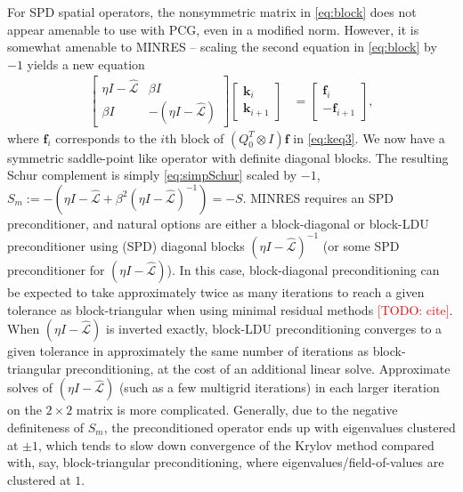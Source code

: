\documentclass[review]{siamart}
\makeatletter
\newcommand{\todo}[1]{\textcolor{red}{[TODO\@: #1]}}
\makeatother
\begin{document}
%
\begin{remark}
For SPD spatial operators, the nonsymmetric matrix in \eqref{eq:block} does
not appear amenable to use with PCG, even in a modified norm. However, it is
somewhat amenable to MINRES -- scaling the second equation in \eqref{eq:block}
by $-1$ yields a new equation
%
\begin{align}\label{eq:block_symm}
\begin{bmatrix} \eta I - \widehat{\mathcal{L}} & \beta I\\
	\beta I & -(\eta I - \widehat{\mathcal{L}})\end{bmatrix}
	\begin{bmatrix}\mathbf{k}_i \\\mathbf{k}_{i+1}\end{bmatrix} 
& = \begin{bmatrix}\mathbf{f}_i \\ -\mathbf{f}_{i+1}\end{bmatrix},
\end{align}
%
where $\mathbf{f}_i$ corresponds to the $i$th block of $(Q_0^T\otimes I)\mathbf{f}$
in \eqref{eq:keq3}. We now have a symmetric saddle-point like operator with
definite diagonal blocks. The resulting Schur complement is simply
\eqref{eq:simpSchur} scaled by $-1$, $S_m := -( \eta I - \widehat{\mathcal{L}} +
\beta^2 (\eta I - \widehat{\mathcal{L}})^{-1}) = -S$. MINRES requires
an SPD preconditioner, and natural options are either a block-diagonal or
block-LDU preconditioner using (SPD) diagonal blocks
$(\eta I  - \widehat{\mathcal{L}})^{-1}$ (or some SPD preconditioner for
$(\eta I  - \widehat{\mathcal{L}})$). In this case, block-diagonal
preconditioning can be expected to take approximately twice as many
iterations to reach a given tolerance as block-triangular when using
minimal residual methods \todo{cite}. When $(\eta I  - \widehat{\mathcal{L}})$
is inverted exactly, block-LDU preconditioning converges to a given
tolerance in approximately the same number of iterations as block-triangular
preconditioning, at the cost of an additional linear solve. Approximate
solves of $(\eta I  - \widehat{\mathcal{L}})$ (such as a few multigrid
iterations) in each larger iteration on the $2\times 2$ matrix is more
complicated. Generally, due to the negative definiteness of $S_m$, the
preconditioned operator ends up with eigenvalues clustered at $\pm 1$, which
tends to slow down convergence of the Krylov method compared with, say,
block-triangular preconditioning, where eigenvalues/field-of-values are
clustered at $1$.
\end{remark}
%
\end{document}
